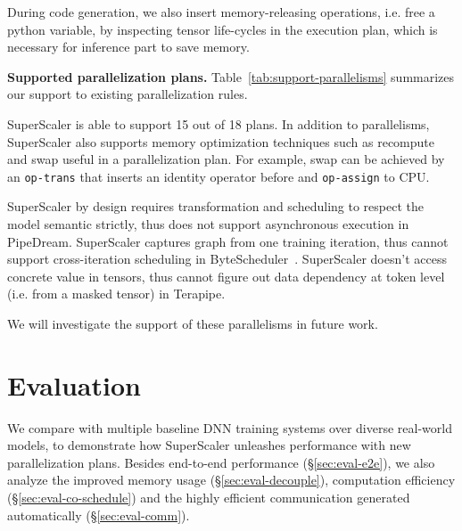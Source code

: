 During code generation, we also insert memory-releasing operations, i.e. free a python variable, by inspecting tensor life-cycles in the execution plan, which is necessary for inference part to save memory.

{\bf  Supported parallelization plans. } Table~\ref{tab:support-parallelisms} summarizes our support to existing parallelization rules. 

{SuperScaler} is able to support 15 out of 18 plans. In addition to parallelisms, {SuperScaler} also supports memory optimization techniques such as recompute and swap useful in a parallelization plan. For example, swap can be achieved by an \texttt{op-trans} that inserts an identity operator before and \texttt{op-assign} to CPU. 

{SuperScaler} by design requires transformation and scheduling to respect the model semantic strictly, thus does not support asynchronous execution in PipeDream. {SuperScaler} captures graph from one training iteration, thus cannot support cross-iteration scheduling in ByteScheduler~\cite{byte-scheduler}. {SuperScaler} doesn't access concrete value in tensors, thus cannot figure out data dependency at token level (i.e. from a masked tensor) in Terapipe.

We will investigate the support of these parallelisms in future work.

\section{Evaluation}
\label{sec:eval}

We compare with multiple baseline DNN training systems over diverse real-world models, to demonstrate how {SuperScaler} unleashes performance with new parallelization plans. Besides end-to-end performance (\S\ref{sec:eval-e2e}), we also analyze the improved memory usage (\S\ref{sec:eval-decouple}), computation efficiency (\S\ref{sec:eval-co-schedule}) and the highly efficient communication generated automatically (\S\ref{sec:eval-comm}).

